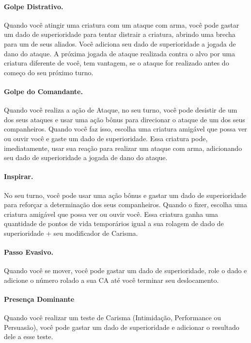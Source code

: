 \documentclass{RPG_Adventure}[2021/10/20]
\begin{document}
\paragraph{Golpe Distrativo.} Quando você atingir uma criatura com um ataque com
arma, você pode gastar um dado de superioridade para tentar distrair a criatura,
abrindo uma brecha para um de seus aliados. Você adiciona seu dado de
superioridade a jogada de dano do ataque. A próxima jogada de ataque realizada
contra o alvo por uma criatura diferente de você, tem vantagem, se o ataque for
realizado antes do começo do seu próximo turno.

\paragraph{Golpe do Comandante.} Quando você realiza a ação de Ataque, no seu
turno, você pode desistir de um dos seus ataques e usar uma ação bônus para
direcionar o ataque de um dos seus companheiros. Quando você faz isso, escolha
uma criatura amigável que possa ver ou ouvir você e gaste um dado de
superioridade. Essa criatura pode, imediatamente, usar sua reação para realizar
um ataque com arma, adicionando seu dado de superioridade a jogada de dano do
ataque.

\paragraph{Inspirar.} No seu turno, você pode usar uma ação bônus e gastar um
dado de superioridade para reforçar a determinação dos seus companheiros. Quando
o fizer, escolha uma criatura amigável que possa ver ou ouvir você. Essa
criatura ganha uma quantidade de pontos de vida temporários igual a sua rolagem
de dado de superioridade + seu modificador de Carisma.

\paragraph{Passo Evasivo.} Quando você se mover, você pode gastar um dado de
superioridade, role o dado e adicione o número rolado a sua CA até você terminar
seu deslocamento.

\paragraph{Presença Dominante} Quando você realizar um teste de Carisma
(Intimidação, Performance ou Persuasão), você pode gastar um dado de
superioridade e adicionar o resultado dele a esse teste.
\end{document}
